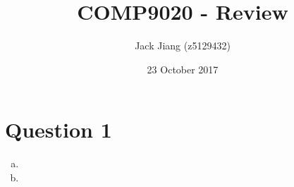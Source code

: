 \documentclass[11pt, a4paper]{article}
\begin{document}
\title{COMP9020 - Review}
\author{Jack Jiang (z5129432)}
\date{ 23 October 2017 }
\maketitle
\graphicspath{{/}}

\section*{Question 1}
\begin{enumerate}[(a)]
    \item

    \item
    \end{enumerate}
\end{document}
